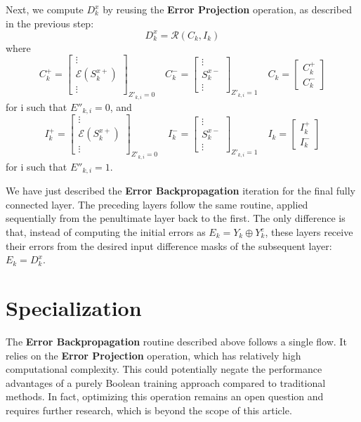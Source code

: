 \documentclass{article}
\theoremstyle{definition}
\theoremstyle{remark}
\begin{document}
Next, we compute \( D^x_k \) by reusing the \textbf{Error Projection} operation, as described in the previous step:
\[
    D^x_k = \mathcal{R}(C_k, I_k)
\]
where
\[
    C^+_k = \begin{bmatrix} \vdots \\ \mathcal{E}(S^{x+}_k) \\ \vdots \end{bmatrix}_{Z'_{k,i} = 0} \quad
    C^-_k = \begin{bmatrix} \vdots \\ S^{x-}_k \\ \vdots \end{bmatrix}_{Z'_{k,i} = 1} \quad
    C_k = \begin{bmatrix} C^+_k \\ C^-_k \end{bmatrix}
\]
for i such that \( E''_{k,i} = 0 \), and
\[
    I^+_k = \begin{bmatrix} \vdots \\ \mathcal{E}(S^{x+}_k) \\ \vdots \end{bmatrix}_{Z'_{k,i} = 0} \quad
    I^-_k = \begin{bmatrix} \vdots \\ S^{x-}_k \\ \vdots \end{bmatrix}_{Z'_{k,i} = 1} \quad
    I_k = \begin{bmatrix} I^+_k \\ I^-_k \end{bmatrix}
\]
for i such that \( E''_{k,i} = 1 \).

We have just described the \textbf{Error Backpropagation} iteration for the final fully connected layer. The preceding layers follow the same routine, applied sequentially from the penultimate layer back to the first. The only difference is that, instead of computing the initial errors as \( E_k = Y_k \oplus Y^e_k \), these layers receive their errors from the desired input difference masks of the subsequent layer: \( E_k = D^x_k \).

\section{Specialization}
The \textbf{Error Backpropagation} routine described above follows a single flow. It relies on the \textbf{Error Projection} operation, which has relatively high computational complexity. This could potentially negate the performance advantages of a purely Boolean training approach compared to traditional methods. In fact, optimizing this operation remains an open question and requires further research, which is beyond the scope of this article.
\end{document}
